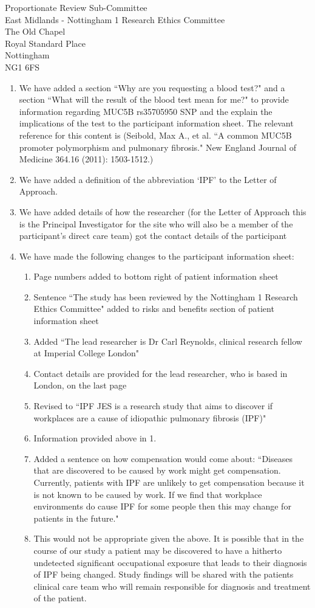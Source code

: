 \documentclass[imperial,letterpaper,pagesize,UScommercial9]{scrlttr2}
\begin{document}
\begin{letter}{    
    Proportionate Review Sub-Committee \\        
    East Midlands - Nottingham 1 Research Ethics Committee \\
    The Old Chapel \\
    Royal Standard Place \\
    Nottingham \\
    NG1 6FS}
    \begin{enumerate}[]
        \item We have added a section ``Why are you requesting a blood test?" and a section ``What will the result of the blood test mean for me?" to provide information regarding MUC5B rs35705950 SNP and the explain the implications of the test to the participant information sheet. The relevant reference for this content is (Seibold, Max A., et al. ``A common MUC5B promoter polymorphism and pulmonary fibrosis." New England Journal of Medicine 364.16 (2011): 1503-1512.)
        \item We have added a definition of the abbreviation `IPF' to the Letter of Approach.
        \item We have added details of how the researcher (for the Letter of Approach this is the Principal Investigator for the site who will also be a member of the participant's direct care team) got the contact details of the participant
        \item We have made the following changes to the participant information sheet:
        \begin{enumerate}[label=(\alph*)]
            \item Page numbers added to bottom right of patient information sheet
            \item Sentence ``The study has been reviewed by the Nottingham 1 Research Ethics Committee" added to risks and benefits section of patient information sheet
            \item Added ``The lead researcher is Dr Carl Reynolds, clinical research fellow at Imperial College London"      
            \item Contact details are provided for the lead researcher, who is based in London, on the last page
            \item Revised to ``IPF JES is a research study that aims to discover if workplaces are a cause of idiopathic pulmonary fibrosis (IPF)"
            \item Information provided above in 1.
            \item Added a sentence on how compensation would come about:
                ``Diseases that are discovered to be caused by work might get compensation. Currently, patients with IPF are unlikely to get compensation because it is not known to be caused by work. If we find that workplace environments do cause IPF for some people then this may change for patients in the future."
            \item This would not be appropriate given the above. It is possible that in the course of our study a patient may be discovered to have a hitherto undetected significant occupational exposure that leads to their diagnosis of IPF being changed. Study findings will be shared with the patients clinical care team who will remain responsible for diagnosis and treatment of the patient.

\end{enumerate}
\end{enumerate}
\end{letter}
\end{document}
